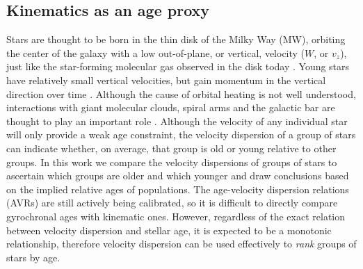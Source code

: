 
\subsection{Kinematics as an age proxy}

Stars are thought to be born in the thin disk of the Milky Way (MW), orbiting
the center of the galaxy with a low out-of-plane, or vertical, velocity ($W$,
or $v_z$), just like the star-forming molecular gas observed in the disk today
\citep[\eg][]{stark1989, stark2005, aumer2009, martig2014, aumer2016}.
Young stars have relatively small vertical velocities, but gain momentum in
the vertical direction over time \citep[\eg][]{nordstrom2004, holmberg2007,
holmberg2009, aumer2009, casagrande2011}.
Although the cause of orbital heating is not well understood, interactions
with giant molecular clouds, spiral arms and the galactic bar are thought to
play an important role \citep[see][for a review of secular evolution in the
MW]{sellwood2014}.
Although the velocity of any individual star will only provide a weak age
constraint, the velocity dispersion of a group of stars can indicate whether,
on average, that group is old or young relative to other groups.
In this work we compare the velocity dispersions of groups of stars to
ascertain which groups are older and which younger and draw conclusions based
on the implied relative ages of populations.
The age-velocity dispersion relations (AVRs) are still actively being
calibrated, so it is difficult to directly compare gyrochronal ages with
kinematic ones.
However, regardless of the exact relation between velocity dispersion and
stellar age, it is expected to be a monotonic relationship, therefore velocity
dispersion can be used effectively to {\it rank} groups of stars by age.

